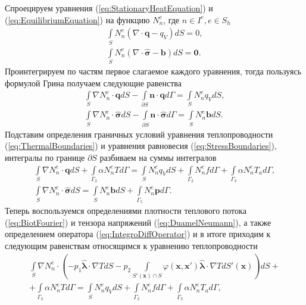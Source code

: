 Спроецируем уравнения (\ref{eq:StationaryHeatEquation}) и (\ref{eq:EquilibriumEquation}) на функцию $N_n^{e}$, где $n \in I^{e}, e \in S_h$
\begin{gather*}
	\int\limits_S N_n^{e} \left( \nabla \cdot \boldsymbol{q} - q_V \right) dS = 0,
	\\
	\int\limits_S N_n^{e} (\nabla \cdot \widehat{\boldsymbol{\sigma}} - \boldsymbol{b}) dS = \boldsymbol{0}.
\end{gather*}
Проинтегрируем по частям первое слагаемое каждого уравнения, тогда пользуясь формулой Грина получаем следующие равенства
\begin{gather*}
	\int\limits_S \nabla N_n^{e} \cdot \boldsymbol{q} dS -
	\int\limits_{\partial S} \boldsymbol{n} \cdot \boldsymbol{q} d\Gamma =
	\int\limits_S N_n^{e} q_V dS, \\
	\int\limits_S \nabla N_n^{e} \cdot \widehat{\boldsymbol{\sigma}} dS -
	\int\limits_{\partial S} \boldsymbol{n} \cdot \widehat{\boldsymbol{\sigma}} d\Gamma =
	\int\limits_S N_n^{e} \boldsymbol{b} dS.
\end{gather*}
Подставим определения граничных условий уравнения теплопроводности (\ref{eq:ThermalBoundaries}) и уравнения равновесия (\ref{eq:StressBoundaries}), интегралы по границе $\partial S$ разбиваем на суммы интегралов
\begin{gather*}
	\int\limits_S \nabla N_n^{e} \cdot \boldsymbol{q} dS +
	\int\limits_{\Gamma_3} \alpha N_n^{e} T d\Gamma =
	\int\limits_S N_n^{e} q_V dS +
	\int\limits_{\Gamma_2} N_n^{e} f d\Gamma +
	\int\limits_{\Gamma_3} \alpha N_n^{e} T_a d\Gamma, \\
	\int\limits_S \nabla N_n^{e} \cdot \widehat{\boldsymbol{\sigma}} dS =	
	\int\limits_S N_n^{e} \boldsymbol{b} dS +
	\int\limits_{\Gamma_5} N_n^{e} \boldsymbol{p} d\Gamma.
\end{gather*}
Теперь воспользуемся определениями плотности теплового потока (\ref{eq:BiotFourier}) и тензора напряжений (\ref{eq:DuamelNeumann}), а также определением оператора (\ref{eq:IntegroDiffOperator}) и в итоге приходим к следующим равенствам относящимся к уравнению теплопроводности
\begin{multline}
	\label{eq:ThermalIntegrate}
	\int\limits_S \nabla N_n^{e} \cdot 
	\left(
		-p_1 \widehat{\boldsymbol{\lambda}} \cdot \nabla T dS
		-
		p_2 	\int\limits_{S'(\boldsymbol{x}) \cap S} 
	\varphi(\boldsymbol{x}, \boldsymbol{x}') \widehat{\boldsymbol{\lambda}} \cdot \nabla T
	dS'(\boldsymbol{x})
	\right) dS 
	+ \\ +
	\int\limits_{\Gamma_3} \alpha N_n^{e} T d\Gamma 
	=
	\int\limits_S N_n^{e} q_V dS +
	\int\limits_{\Gamma_2} N_n^{e} f d\Gamma + 
	\int\limits_{\Gamma_3} \alpha N_n^{e} T_a d\Gamma,
\end{multline}
